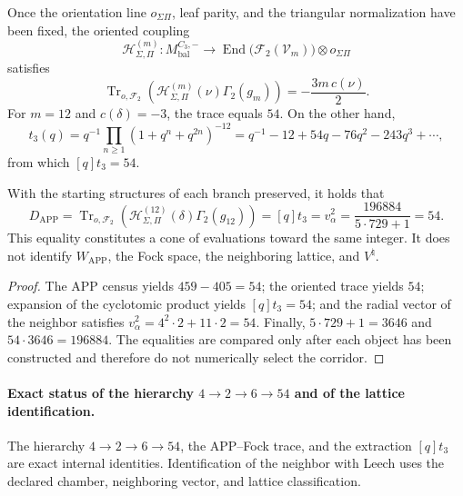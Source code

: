 Once the orientation line \(o_{\Sigma\Pi}\), leaf parity, and the
triangular normalization have been fixed, the oriented coupling
\[
 \mathcal H_{\Sigma,\Pi}^{(m)}:
 M_{\mathrm{bal}}^{C_3,-}
 \longrightarrow
 \operatorname{End}\!\bigl(\mathcal F_2(\mathcal V_m)\bigr)
 \otimes o_{\Sigma\Pi}
\]
satisfies
\[
 \operatorname{Tr}_{o,\mathcal F_2}
 \left(\mathcal H_{\Sigma,\Pi}^{(m)}(\nu)\Gamma_2(g_m)\right)
 =-\frac{3m\,c(\nu)}2.
\]
For \(m=12\) and \(c(\delta)=-3\), the trace equals \(54\). On the other hand,
\[
 t_3(q)=q^{-1}\prod_{n\ge1}(1+q^n+q^{2n})^{-12}
       =q^{-1}-12+54q-76q^2-243q^3+\cdots,
\]
from which \([q]t_3=54\).

\begin{theorem}
\label{thm:cierre-vtm-indice-comun-54}
With the starting structures of each branch preserved, it holds that
\[
 \boxed{
 D_{\mathrm{APP}}
 =\operatorname{Tr}_{o,\mathcal F_2}
   \left(\mathcal H_{\Sigma,\Pi}^{(12)}(\delta)\Gamma_2(g_{12})\right)
 =[q]t_3
 =v_\alpha^2
 =\frac{196884}{5\cdot729+1}
 =54.}
\]
This equality constitutes a cone of evaluations toward the same integer. It does not
identify \(W_{\mathrm{APP}}\), the Fock space, the neighboring lattice, and
\(V^\natural\).
\end{theorem}

\begin{proof}
The APP census yields \(459-405=54\); the oriented trace yields
\(54\); expansion of the cyclotomic product yields \([q]t_3=54\); and
the radial vector of the neighbor satisfies \(v_\alpha^2=4^2\cdot2+11\cdot2=54\). Finally,
\(5\cdot729+1=3646\) and \(54\cdot3646=196884\). The equalities are compared only after each
object has been constructed and therefore do not numerically select the
corridor.
\end{proof}

\paragraph{Exact status of the hierarchy \(4\to2\to6\to54\) and of the lattice
identification.}
The hierarchy \(4\to2\to6\to54\), the APP--Fock trace, and the extraction
\([q]t_3\) are exact internal identities. Identification of the neighbor with
Leech uses the declared chamber, neighboring vector, and lattice
classification.
%
